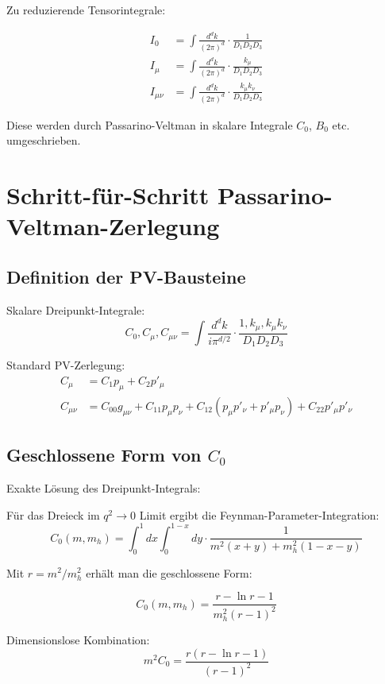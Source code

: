 	Zu reduzierende Tensorintegrale:
	
	\begin{align}
		I_0 &= \int \frac{d^d k}{(2\pi)^d} \cdot \frac{1}{D_1 D_2 D_3}\\
		I_\mu &= \int \frac{d^d k}{(2\pi)^d} \cdot \frac{k_\mu}{D_1 D_2 D_3}\\
		I_{\mu\nu} &= \int \frac{d^d k}{(2\pi)^d} \cdot \frac{k_\mu k_\nu}{D_1 D_2 D_3}
	\end{align}
	
	Diese werden durch Passarino-Veltman in skalare Integrale $C_0$, $B_0$ etc. umgeschrieben.
	
	\section{Schritt-für-Schritt Passarino-Veltman-Zerlegung}
	
	\subsection{Definition der PV-Bausteine}
	
	\begin{pvbox}
		Skalare Dreipunkt-Integrale:
		\begin{equation}
			C_0, C_\mu, C_{\mu\nu} = \int \frac{d^d k}{i\pi^{d/2}} \cdot \frac{1, k_\mu, k_\mu k_\nu}{D_1 D_2 D_3}
		\end{equation}
		
		Standard PV-Zerlegung:
		\begin{align}
			C_\mu &= C_1 p_\mu + C_2 p'_\mu\\
			C_{\mu\nu} &= C_{00} g_{\mu\nu} + C_{11} p_\mu p_\nu + C_{12}(p_\mu p'_\nu + p'_\mu p_\nu) + C_{22} p'_\mu p'_\nu
		\end{align}
	\end{pvbox}
	
	\subsection{Geschlossene Form von $C_0$}
	
	\begin{pvbox}
		Exakte Lösung des Dreipunkt-Integrals:
		
		Für das Dreieck im $q^2 \to 0$ Limit ergibt die Feynman-Parameter-Integration:
		\begin{equation}
			C_0(m, m_h) = \int_0^1 dx \int_0^{1-x} dy \cdot \frac{1}{m^2(x+y) + m_h^2(1-x-y)}
		\end{equation}
		
		Mit $r = m^2/m_h^2$ erhält man die geschlossene Form:
		
		\begin{equation}
			C_0(m, m_h) = \frac{r - \ln r - 1}{m_h^2(r-1)^2}
		\end{equation}
		
		Dimensionslose Kombination:
		\begin{equation}
			m^2C_0 = \frac{r(r - \ln r - 1)}{(r-1)^2}
		\end{equation}
	\end{pvbox}
	
